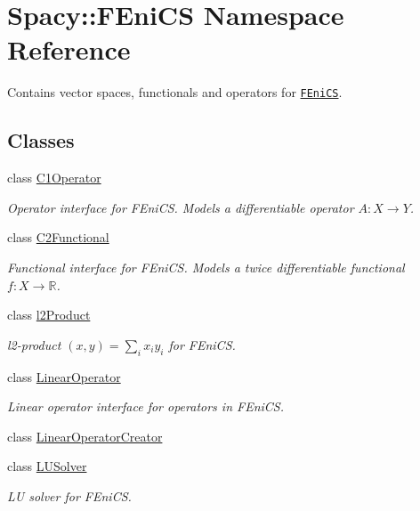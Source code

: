 \hypertarget{namespaceSpacy_1_1FEniCS}{}\section{Spacy\+:\+:F\+Eni\+C\+S Namespace Reference}
\label{namespaceSpacy_1_1FEniCS}


Contains vector spaces, functionals and operators for \href{www.fenicsproject.org}{\tt F\+Eni\+C\+S}.  


\subsection*{Classes}
\begin{DoxyCompactItemize}
\item 
class \hyperlink{classSpacy_1_1FEniCS_1_1C1Operator}{C1\+Operator}
\begin{DoxyCompactList}\small\item\em Operator interface for F\+Eni\+C\+S. Models a differentiable operator $A:X\rightarrow Y$. \end{DoxyCompactList}\item 
class \hyperlink{classSpacy_1_1FEniCS_1_1C2Functional}{C2\+Functional}
\begin{DoxyCompactList}\small\item\em Functional interface for F\+Eni\+C\+S. Models a twice differentiable functional $f:X\rightarrow \mathbb{R}$. \end{DoxyCompactList}\item 
class \hyperlink{classSpacy_1_1FEniCS_1_1l2Product}{l2\+Product}
\begin{DoxyCompactList}\small\item\em l2-\/product $(x,y) = \sum_i x_i y_i $ for F\+Eni\+C\+S. \end{DoxyCompactList}\item 
class \hyperlink{classSpacy_1_1FEniCS_1_1LinearOperator}{Linear\+Operator}
\begin{DoxyCompactList}\small\item\em Linear operator interface for operators in F\+Eni\+C\+S. \end{DoxyCompactList}\item 
class \hyperlink{classSpacy_1_1FEniCS_1_1LinearOperatorCreator}{Linear\+Operator\+Creator}
\item 
class \hyperlink{classSpacy_1_1FEniCS_1_1LUSolver}{L\+U\+Solver}
\begin{DoxyCompactList}\small\item\em L\+U solver for F\+Eni\+C\+S. \end{DoxyCompactList}\item 

\end{DoxyCompactItemize}
